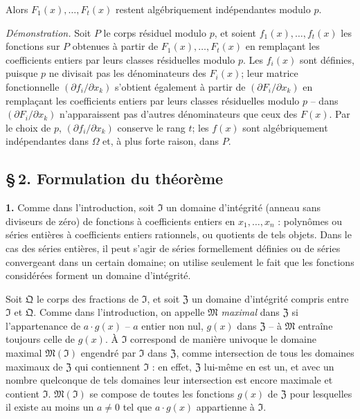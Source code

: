 Alors $F_1(x),\ldots,F_t(x)$ restent algébriquement indépendantes modulo $p$.

\noindent\textit{Démonstration.}
Soit $P$ le corps résiduel modulo $p$, et soient $f_1(x),\ldots,f_t(x)$ les fonctions sur $P$ obtenues à partir de $F_1(x),\ldots,F_t(x)$ en remplaçant les coefficients entiers par leurs classes résiduelles modulo $p$. Les $f_i(x)$ sont définies, puisque $p$ ne divisait pas les dénominateurs des $F_i(x)$; leur matrice fonctionnelle $(\partial f_i/\partial x_k)$ s'obtient également à partir de $(\partial F_i/\partial x_k)$ en remplaçant les coefficients entiers par leurs classes résiduelles modulo $p$ -- dans $(\partial F_i/\partial x_k)$ n'apparaissent pas d'autres dénominateurs que ceux des $F(x)$. Par le choix de $p$, $(\partial f_i/\partial x_k)$ conserve le rang $t$; les $f(x)$ sont algébriquement indépendantes dans $\Omega$ et, à plus forte raison, dans $P$.

\subsection*{\S\,2. Formulation du théorème}

\smallskip
\noindent\textbf{1.}
Comme dans l'introduction, soit $\mathfrak{I}$ un domaine d'intégrité (anneau sans diviseurs de zéro) de fonctions à coefficients entiers en $x_1,\ldots,x_n$ : polynômes ou séries entières à coefficients entiers rationnels, ou quotients de tels objets. Dans le cas des séries entières, il peut s'agir de séries formellement définies ou de séries convergeant dans un certain domaine; on utilise seulement le fait que les fonctions considérées forment un domaine d'intégrité.

Soit $\mathfrak{Q}$ le corps des fractions de $\mathfrak{I}$, et soit $\mathfrak{Z}$ un domaine d'intégrité compris entre $\mathfrak{I}$ et $\mathfrak{Q}$. Comme dans l'introduction, on appelle $\mathfrak{M}$ \emph{maximal} dans $\mathfrak{Z}$ si l'appartenance de $a\cdot g(x)$ -- $a$ entier non nul, $g(x)$ dans $\mathfrak{Z}$ -- à $\mathfrak{M}$ entraîne toujours celle de $g(x)$. À $\mathfrak{I}$ correspond de manière univoque le domaine maximal $\mathfrak{M}(\mathfrak{I})$ engendré par $\mathfrak{I}$ dans $\mathfrak{Z}$, comme intersection de tous les domaines maximaux de $\mathfrak{Z}$ qui contiennent $\mathfrak{I}$ : en effet, $\mathfrak{Z}$ lui-même en est un, et avec un nombre quelconque de tels domaines leur intersection est encore maximale et contient $\mathfrak{I}$. $\mathfrak{M}(\mathfrak{I})$ se compose de toutes les fonctions $g(x)$ de $\mathfrak{Z}$ pour lesquelles il existe au moins un $a\ne0$ tel que $a\cdot g(x)$ appartienne à $\mathfrak{I}$.

